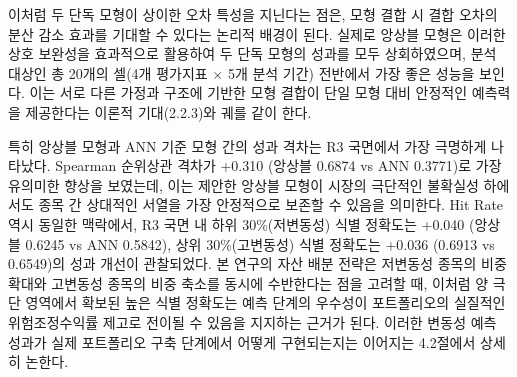 \documentclass{article}
\begin{document}
이처럼 두 단독 모형이 상이한 오차 특성을 지닌다는 점은, 모형 결합 시 결합 오차의 분산 감소 효과를 기대할 수 있다는 논리적 배경이 된다. 실제로 앙상블 모형은 이러한 상호 보완성을 효과적으로 활용하여 두 단독 모형의 성과를 모두 상회하였으며, 분석 대상인 총 20개의 셀(4개 평가지표 $\times$ 5개 분석 기간) 전반에서 가장 좋은 성능을 보인다. 이는 서로 다른 가정과 구조에 기반한 모형 결합이 단일 모형 대비 안정적인 예측력을 제공한다는 이론적 기대(2.2.3)와 궤를 같이 한다.

특히 앙상블 모형과 ANN 기준 모형 간의 성과 격차는 R3 국면에서 가장 극명하게 나타났다. Spearman 순위상관 격차가 +0.310 (앙상블 0.6874 vs ANN 0.3771)로 가장 유의미한 향상을 보였는데, 이는 제안한 앙상블 모형이 시장의 극단적인 불확실성 하에서도 종목 간 상대적인 서열을 가장 안정적으로 보존할 수 있음을 의미한다. Hit Rate 역시 동일한 맥락에서, R3 국면 내 하위 30\%(저변동성) 식별 정확도는 +0.040 (앙상블 0.6245 vs ANN 0.5842), 상위 30\%(고변동성) 식별 정확도는 +0.036 (0.6913 vs 0.6549)의 성과 개선이 관찰되었다. 본 연구의 자산 배분 전략은 저변동성 종목의 비중 확대와 고변동성 종목의 비중 축소를 동시에 수반한다는 점을 고려할 때, 이처럼 양 극단 영역에서 확보된 높은 식별 정확도는 예측 단계의 우수성이 포트폴리오의 실질적인 위험조정수익률 제고로 전이될 수 있음을 지지하는 근거가 된다. 이러한 변동성 예측 성과가 실제 포트폴리오 구축 단계에서 어떻게 구현되는지는 이어지는 4.2절에서 상세히 논한다.
\end{document}
